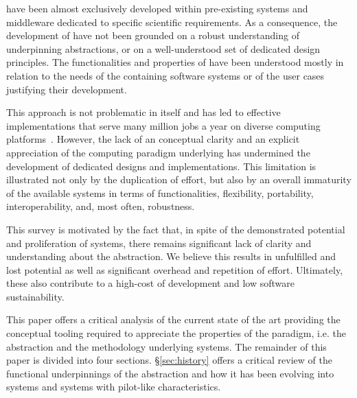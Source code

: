 \documentclass{sig-alternate}
\begin{document}



\pilotjobs have been almost exclusively developed within pre-existing systems
and middleware dedicated to specific scientific requirements. As a consequence,
the development of \pilotjobs have not been grounded on a robust understanding
of underpinning abstractions, or on a well-understood set of dedicated design
principles. The functionalities and properties of \pilotjobs have been
understood mostly in relation to the needs of the containing software systems or
of the user cases justifying their development.

This approach is not problematic in itself and has led to effective
implementations that serve many million jobs a year on diverse computing
platforms~\cite{maeno2014evolution,katz2012}. However, the lack of an conceptual
clarity and an explicit appreciation of the computing paradigm underlying
\pilotjobs has undermined the development of dedicated designs and
implementations. This limitation is illustrated not only by the duplication of
effort, but also by an overall immaturity of the available systems in terms of
functionalities, flexibility, portability, interoperability, and, most often,
robustness.

This survey is motivated by the fact that, in spite of the demonstrated
potential and proliferation of \pilotjob systems, there remains significant lack
of clarity and understanding about the \pilotjob abstraction. We believe this
results in unfulfilled and lost potential as well as significant overhead and
repetition of effort. Ultimately, these also contribute to a high-cost of
development and low software sustainability.

This paper offers a critical analysis of the current state of the art providing
the conceptual tooling required to appreciate the properties of the \pilot
paradigm, i.e. the abstraction and the methodology underlying \pilotjobs
systems. The remainder of this paper is divided into four sections.
\S\ref{sec:history} offers a critical review of the functional underpinnings of
the \pilot abstraction and how it has been evolving into \pilotjob systems and
systems with pilot-like characteristics.
\end{document}
